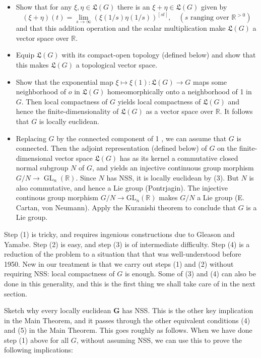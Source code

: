 \documentclass[10pt]{article}
\begin{document}
\begin{itemize}
  \item[(1)] Show that for any $\xi, \eta \in \mathfrak{L}(G)$ there is an $\xi+\eta \in \mathfrak{L}(G)$ given by
$$
(\xi+\eta)(t)=\lim _{s \rightarrow \infty}(\xi(1 / s) \eta(1 / s))^{[s t]}, \quad\left(s \text { ranging over } \mathbb{R}^{>0}\right)
$$
and that this addition operation and the scalar multiplication make $\mathfrak{L}(G)$ a vector space over $\mathbb{R}$.
  \item[(2)] Equip $\mathfrak{L}(G)$ with its compact-open topology (defined below) and show that this makes $\mathfrak{L}(G)$ a topological vector space.
  \item[(3)] Show that the exponential map $\xi \mapsto \xi(1): \mathfrak{L}(G) \rightarrow G$ maps some neighborhood of $o$ in $\mathfrak{L}(G)$ homeomorphically onto a neighborhood of 1 in $G$. Then local compactness of $G$ yields local compactness of $\mathfrak{L}(G)$ and hence the finite-dimensionality of $\mathfrak{L}(G)$ as a vector space over $\mathbb{R}$. It follows that $G$ is locally euclidean.
  \item[(4)] Replacing $G$ by the connected component of 1 , we can assume that $G$ is connected. Then the adjoint representation (defined below) of $G$ on the finite-dimensional vector space $\mathfrak{L}(G)$ has as its kernel a commutative closed normal subgroup $N$ of $G$, and yields an injective continuous group morphism $G / N \rightarrow \operatorname{GL}_{n}(\mathbb{R})$. Since $N$ has NSS, it is locally euclidean by (3). But $N$ is also commutative, and hence a Lie group (Pontrjagin). The injective continous group morphism $G / N \rightarrow \mathrm{GL}_{n}(\mathbb{R})$ makes $G / N$ a Lie group (E. Cartan, von Neumann). Apply the Kuranishi theorem to conclude that $G$ is a Lie group.
\end{itemize}

Step (1) is tricky, and requires ingenious constructions due to Gleason and Yamabe. Step (2) is easy, and step (3) is of intermediate difficulty. Step (4) is a reduction of the problem to a situation that that was well-understood before 1950. New in our treatment is that we carry out steps (1) and (2) without requiring NSS: local compactness of $G$ is enough. Some of (3) and (4) can also be done in this generality, and this is the first thing we shall take care of in the next section.

Sketch why every locally euclidean $\boldsymbol{G}$ has NSS. This is the other key implication in the Main Theorem, and it passes through the other equivalent conditions (4) and (5) in the Main Theorem. This goes roughly as follows. When we have done step (1) above for all $G$, without assuming NSS, we can use this to prove the following implications:
\end{document}
